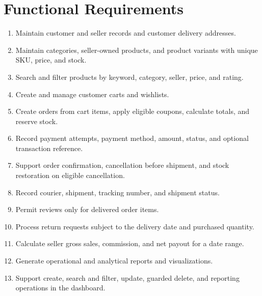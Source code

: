 \documentclass[11pt,a4paper,oneside]{report}
\begin{document}
\section{Functional Requirements}
\begin{enumerate}
 \item Maintain customer and seller records and customer delivery addresses.
 \item Maintain categories, seller-owned products, and product variants with unique SKU, price, and stock.
 \item Search and filter products by keyword, category, seller, price, and rating.
 \item Create and manage customer carts and wishlists.
 \item Create orders from cart items, apply eligible coupons, calculate totals, and reserve stock.
 \item Record payment attempts, payment method, amount, status, and optional transaction reference.
 \item Support order confirmation, cancellation before shipment, and stock restoration on eligible cancellation.
 \item Record courier, shipment, tracking number, and shipment status.
 \item Permit reviews only for delivered order items.
 \item Process return requests subject to the delivery date and purchased quantity.
 \item Calculate seller gross sales, commission, and net payout for a date range.
 \item Generate operational and analytical reports and visualizations.
 \item Support create, search and filter, update, guarded delete, and reporting operations in the dashboard.
\end{enumerate}
\end{document}
